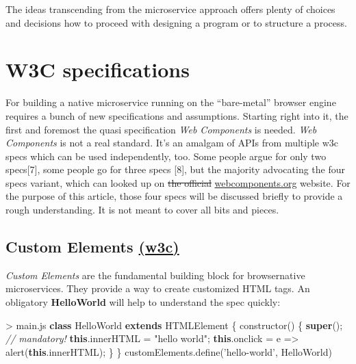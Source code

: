 \documentclass[]{assets/latex/ieee}
\newenvironment{Shaded}{}{}
\newcommand{\KeywordTok}[1]{\textcolor[rgb]{0.00,0.44,0.13}{\textbf{{#1}}}}
\newcommand{\StringTok}[1]{\textcolor[rgb]{0.25,0.44,0.63}{{#1}}}
\newcommand{\CommentTok}[1]{\textcolor[rgb]{0.38,0.63,0.69}{\textit{{#1}}}}
\newcommand{\VariableTok}[1]{\textcolor[rgb]{0.10,0.09,0.49}{{#1}}}
\newcommand{\OperatorTok}[1]{\textcolor[rgb]{0.40,0.40,0.40}{{#1}}}
\newcommand{\AttributeTok}[1]{\textcolor[rgb]{0.49,0.56,0.16}{{#1}}}
\newcommand{\NormalTok}[1]{{#1}}
\begin{document}
The ideas transcending from the microservice approach offers plenty of
choices and decisions how to proceed with designing a program or to
structure a process.

\section{W3C specifications}\label{w3c-specifications}

For building a native microservice running on the ``bare-metal'' browser
engine requires a bunch of new specifications and assumptions. Starting
right into it, the first and foremost the quasi specification \emph{Web
Components} is needed. \emph{Web Components} is not a real standard.
It's an amalgam of APIs from multiple w3c specs which can be used
independently, too. Some people argue for only two specs{[}7{]}, some
people go for three specs {[}8{]}, but the majority advocating the four
specs variant, which can looked up on \sout{the official}
\href{http://webcomponents.org}{webcomponents.org} website. For the
purpose of this article, those four specs will be discussed briefly to
provide a rough understanding. It is not meant to cover all bits and
pieces.

\subsection{\texorpdfstring{Custom Elements
\href{http://w3c.github.io/webcomponents/spec/custom/}{(w3c)}}{Custom Elements (w3c)}}\label{custom-elements-w3c}

\emph{Custom Elements} are the fundamental building block for
browsernative microservices. They provide a way to create customized
HTML tags. An obligatory \textbf{HelloWorld} will help to understand the
spec quickly:

\begin{Shaded}
\begin{Highlighting}[]
\OperatorTok{>} \VariableTok{main}\NormalTok{.}\AttributeTok{js}
\KeywordTok{class} \NormalTok{HelloWorld }\KeywordTok{extends} \NormalTok{HTMLElement }\OperatorTok{\{}
    \AttributeTok{constructor}\NormalTok{() }\OperatorTok{\{}
        \KeywordTok{super}\NormalTok{()}\OperatorTok{;} \CommentTok{// mandatory!}
        \KeywordTok{this}\NormalTok{.}\AttributeTok{innerHTML} \OperatorTok{=} \StringTok{"hello world"}\OperatorTok{;}
        \KeywordTok{this}\NormalTok{.}\AttributeTok{onclick} \OperatorTok{=} \NormalTok{e }\OperatorTok{=>} \AttributeTok{alert}\NormalTok{(}\KeywordTok{this}\NormalTok{.}\AttributeTok{innerHTML}\NormalTok{)}\OperatorTok{;}
    \OperatorTok{\}}
\OperatorTok{\}}
\VariableTok{customElements}\NormalTok{.}\AttributeTok{define}\NormalTok{(}\StringTok{'hello-world'}\OperatorTok{,} \NormalTok{HelloWorld)}
\end{Highlighting}
\end{Shaded}
\end{document}
